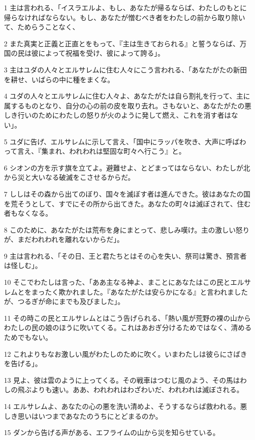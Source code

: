 \par 1 主は言われる、「イスラエルよ、もし、あなたが帰るならば、わたしのもとに帰らなければならない。もし、あなたが憎むべき者をわたしの前から取り除いて、ためらうことなく、
\par 2 また真実と正義と正直とをもって、『主は生きておられる』と誓うならば、万国の民は彼によって祝福を受け、彼によって誇る」。
\par 3 主はユダの人々とエルサレムに住む人々にこう言われる、「あなたがたの新田を耕せ、いばらの中に種をまくな。
\par 4 ユダの人々とエルサレムに住む人々よ、あなたがたは自ら割礼を行って、主に属するものとなり、自分の心の前の皮を取り去れ。さもないと、あなたがたの悪しき行いのためにわたしの怒りが火のように発して燃え、これを消す者はない」。
\par 5 ユダに告げ、エルサレムに示して言え、「国中にラッパを吹き、大声に呼ばわって言え、『集まれ、われわれは堅固な町々へ行こう』と。
\par 6 シオンの方を示す旗を立てよ。避難せよ、とどまってはならない、わたしが北から災と大いなる破滅をこさせるからだ。
\par 7 ししはその森から出てのぼり、国々を滅ぼす者は進んできた。彼はあなたの国を荒そうとして、すでにその所から出てきた。あなたの町々は滅ぼされて、住む者もなくなる。
\par 8 このために、あなたがたは荒布を身にまとって、悲しみ嘆け。主の激しい怒りが、まだわれわれを離れないからだ」。
\par 9 主は言われる、「その日、王と君たちとはその心を失い、祭司は驚き、預言者は怪しむ」。
\par 10 そこでわたしは言った、「ああ主なる神よ、まことにあなたはこの民とエルサレムとをまったく欺かれました。『あなたがたは安らかになる』と言われましたが、つるぎが命にまでも及びました」。
\par 11 その時この民とエルサレムとはこう告げられる、「熱い風が荒野の裸の山からわたしの民の娘のほうに吹いてくる。これはあおぎ分けるためではなく、清めるためでもない。
\par 12 これよりもなお激しい風がわたしのために吹く。いまわたしは彼らにさばきを告げる」。
\par 13 見よ、彼は雲のように上ってくる。その戦車はつむじ風のよう、その馬はわしの飛ぶよりも速い。ああ、われわれはわざわいだ、われわれは滅ぼされる。
\par 14 エルサレムよ、あなたの心の悪を洗い清めよ、そうするならば救われる。悪しき思いはいつまであなたのうちにとどまるのか。
\par 15 ダンから告げる声がある、エフライムの山から災を知らせている。
